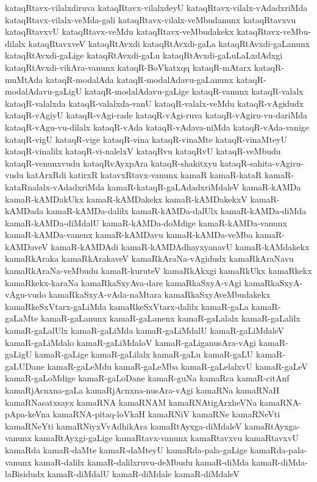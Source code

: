 {kataqRtavx-vilalxdiruva
kataqRtavx-vilalxdeyU
kataqRtavx-vilalx-vAdadxriMda
kataqRtavx-vilalx-veMda-gali
kataqRtavx-vilalx-veMbudanunx
kataqRtavxvu
kataqRtavxvU
kataqRtavx-veMdu
kataqRtavx-veMbudakekx
kataqRtavx-veMbu-dilalx
kataqRtavxveV
kataqRtAvxdi
kataqRtAvxdi-gaLa
kataqRtAvxdi-gaLanunx
kataqRtAvxdi-gaLige
kataqRtAvxdi-gaLu
kataqRtAvxdi-gaLuLaLxdAdxgi
kataqRtAvxdi-vikAra-vanunx
kataqR-BoVkatxqq
kataqR-mAtarx
kataqR-muMtAda
kataqR-modalAda
kataqR-modalAdavu-gaLanunx
kataqR-modalAdavu-gaLigU
kataqR-modalAdavu-gaLige
kataqR-vanunx
kataqR-valalx
kataqR-valalxda
kataqR-valalxda-vanU
kataqR-valalx-veMdu
kataqR-vAgidudx
kataqR-vAgiyU
kataqR-vAgi-rade
kataqR-vAgi-ruva
kataqR-vAgiru-vu-dariMda
kataqR-vAgu-vu-dilalx
kataqR-vAda
kataqR-vAdava-niMda
kataqR-vAda-vanige
kataqR-vigU
kataqR-vige
kataqR-vina
kataqR-vinaMte
kataqR-vinaMteyU
kataqR-vinalilx
kataqR-vi-nalelxV
kataqRvu
kataqRvU
kataqR-veMbudu
kataqR-venunxvudu
kataqRvAyxpAra
kataqR-shakitxyu
kataqR-sahita-vAgiru-vudu
katArxRdi
katirxR
katavxRtavx-vanunx
kamaR
kamaR-kataR
kamaR-kataRnalalx-vAdadxriMda
kamaR-kataqR-gaLAdadxriMdaleV
kamaR-kAMDa
kamaR-kAMDakUkx
kamaR-kAMDakekx
kamaR-kAMDakekxV
kamaR-kAMDada
kamaR-kAMDa-dalilx
kamaR-kAMDa-dalUlx
kamaR-kAMDa-diMda
kamaR-kAMDa-diMdalU
kamaR-kAMDa-doMdige
kamaR-kAMDa-vanunx
kamaR-kAMDa-vanenx
kamaR-kAMDavu
kamaR-kAMDa-veMba
kamaR-kAMDaveV
kamaR-kAMDAdi
kamaR-kAMDAdhayxyanavU
kamaR-kAMdakekx
kamaRkAraka
kamaRkArakaveV
kamaRkAraNa-vAgidudx
kamaRkAraNavu
kamaRkAraNa-veMbudu
kamaR-kuruteV
kamaRkAkxgi
kamaRkUkx
kamaRkekx
kamaRkekx-karaNa
kamaRkaSxyAva-dare
kamaRkaSxyA-vAgi
kamaRkaSxyA-vAgu-vudo
kamaRkaSxyA-vAda-naMtara
kamaRkaSxyAveMbudakekx
kamaRkeSxVtarx-gaLiMda
kamaRkeSxVtarx-dalilx
kamaR-gaLa
kamaR-gaLaMte
kamaR-gaLanunx
kamaR-gaLanenx
kamaR-gaLalalx
kamaR-gaLalilx
kamaR-gaLalUlx
kamaR-gaLiMda
kamaR-gaLiMdalU
kamaR-gaLiMdaleV
kamaR-gaLiMdalo
kamaR-gaLiMdaloV
kamaR-gaLiganusAra-vAgi
kamaR-gaLigU
kamaR-gaLige
kamaR-gaLilalx
kamaR-gaLu
kamaR-gaLU
kamaR-gaLUDane
kamaR-gaLeMdu
kamaR-gaLeMba
kamaR-gaLelalxvU
kamaR-gaLeV
kamaR-gaLoMdige
kamaR-gaLoDane
kamaR-guNa
kamaRca
kamaR-citAnf
kamaRjAcnxna-gaLa
kamaRjAcnxna-nusAra-vAgi
kamaRNa
kamaRNaH
kamaRNasatxsayx
kamaRNA
kamaRNAM
kamaRNAtigArxheVNa
kamaRNA-pApa-keVna
kamaRNA-pitaq-loVkaH
kamaRNiV
kamaRNe
kamaRNeVti
kamaRNeYti
kamaRNiyxVvAdhikAra
kamaRtAyxga-diMdaleV
kamaRtAyxga-vanunx
kamaRtAyxgi-gaLige
kamaRtavx-vanunx
kamaRtavxvu
kamaRtavxvU
kamaRda
kamaR-daMte
kamaR-daMteyU
kamaRda-pala-gaLige
kamaRda-pala-vanunx
kamaR-dalilx
kamaR-dalilxruvu-deMbudu
kamaR-diMda
kamaR-diMda-laBisidudx
kamaR-diMdalU
kamaR-diMdale
kamaR-diMdaleV
}
